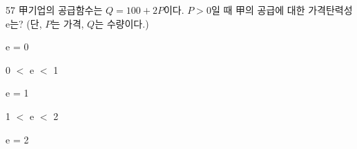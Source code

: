 \begin{question}{57}
甲기업의 공급함수는 $Q = 100 + 2P$이다. $P > 0$일 때 甲의 공급에 대한 가격탄력성 e는? (단, $P$는 가격, $Q$는 수량이다.)
\begin{choices}
  \item e = 0
  \item 0 $<$ e $<$ 1
  \item e = 1
  \item 1 $<$ e $<$ 2
  \item e = 2
\end{choices}
\end{question}
